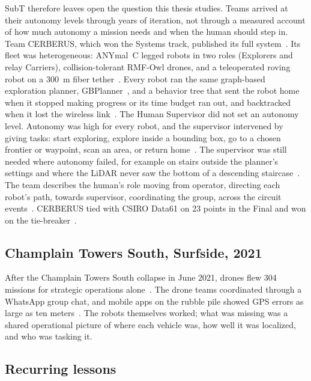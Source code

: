 SubT therefore leaves open the question this thesis studies.
Teams arrived at their autonomy levels through years of iteration, not through a measured account of how much autonomy a mission needs and when the human should step in.
Team CERBERUS, which won the Systems track, published its full system~\citep{tranzatto2022scirob,tranzatto2022finals,tranzatto2022tunnelurban}.
Its fleet was heterogeneous: ANYmal~C legged robots in two roles (Explorers and relay Carriers), collision-tolerant RMF-Owl drones, and a teleoperated roving robot on a 300~m fiber tether~\citep{tranzatto2022finals}.
Every robot ran the same graph-based exploration planner, GBPlanner~\citep{dang2020gbplanner,gbplannerros}, and a behavior tree that sent the robot home when it stopped making progress or its time budget ran out, and backtracked when it lost the wireless link~\citep{tranzatto2022finals}.
The Human Supervisor did not set an autonomy level.
Autonomy was high for every robot, and the supervisor intervened by giving tasks: start exploring, explore inside a bounding box, go to a chosen frontier or waypoint, scan an area, or return home~\citep{tranzatto2022finals}.
The supervisor was still needed where autonomy failed, for example on stairs outside the planner's settings and where the LiDAR never saw the bottom of a descending staircase~\citep{tranzatto2022finals}.
The team describes the human's role moving from operator, directing each robot's path, towards supervisor, coordinating the group, across the circuit events~\citep{tranzatto2022finals}.
CERBERUS tied with CSIRO Data61 on 23 points in the Final and won on the tie-breaker~\citep{tranzatto2022finals}.

\subsection{Champlain Towers South, Surfside, 2021}

After the Champlain Towers South collapse in June 2021, drones flew 304 missions for strategic operations alone~\citep{murphy2021surfside}.
The drone teams coordinated through a WhatsApp group chat, and mobile apps on the rubble pile showed GPS errors as large as ten meters~\citep{murphy2021surfside}.
The robots themselves worked; what was missing was a shared operational picture of where each vehicle was, how well it was localized, and who was tasking it.

\subsection{Recurring lessons}

